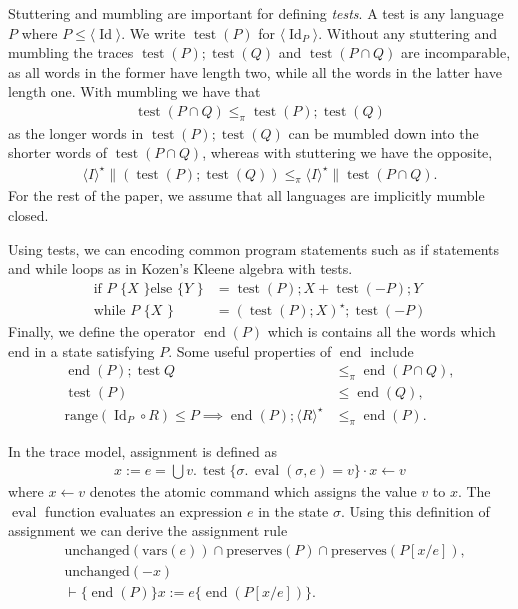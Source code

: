 \documentclass{llncs}
\DeclareMathOperator{\test}{test}
\DeclareMathOperator{\eval}{eval}
\DeclareMathOperator{\Id}{Id}
\DeclareMathOperator{\edn}{end}
\begin{document}
Stuttering and mumbling are important for defining \emph{tests}. A
test is any language $P$ where $P \le \langle \Id\rangle$. We
write $\test(P)$ for $\langle \Id_P\rangle$. Without any
stuttering and mumbling the traces $\test(P); \test(Q)$ and
$\test(P \cap Q)$ are incomparable, as all words in the former have
length two, while all the words in the latter have length one. With mumbling we have that
\begin{align*}
\test(P \cap Q) \le_\pi \test(P); \test(Q)
\end{align*}
as the longer words in $\test(P);\test(Q)$ can be mumbled down into
the shorter words of $\test(P\cap Q)$, whereas with stuttering we
have the opposite,
\begin{align*}
\langle I\rangle^\star \| (\test(P);\test(Q)) \le_\pi \langle I\rangle^\star \| \test(P \cap Q).
\end{align*}
For the rest of the paper, we assume that all languages are
implicitly mumble closed.

Using tests, we can encoding common program statements such as if
statements and while loops as in Kozen's Kleene algebra with tests.
\begin{align*}
\text{if } P \text{ \{ } X \text { \} else \{ } Y \text{ \}} &= \test(P); X + \test(- P); Y\\
\text{while } P \text{ \{ } X \text{ \}} &= (\test(P);X)^\star;\test(- P)
\end{align*}
Finally, we define the operator $\edn(P)$ which is contains all the
words which end in a state satisfying $P$. Some useful properties of $\edn$ include
\begin{align*}
\edn(P); \test{Q} &\le_\pi \edn(P \cap Q),\\
\test(P) &\le \edn(Q),\\
\text{range}(\Id_P \circ R) \le P \implies \edn(P); \langle R\rangle^\star &\le_\pi \edn(P).
\end{align*}

In the trace model, assignment is defined as
\begin{align*}
  x := e = \bigcup v.\,\test\{\sigma.\,\eval(\sigma,e) = v\} \cdot x \leftarrow v
\end{align*}
where $x \leftarrow v$ denotes the atomic command which assigns the
value $v$ to $x$. The $\eval$ function evaluates an expression $e$ in
the state $\sigma$. Using this definition of assignment we can derive
the assignment rule
\begin{align*}
&\text{unchanged}(\text{vars}(e)) \cap \text{preserves}(P) \cap \text{preserves}(P[x/e]),\\
&\text{unchanged}(- {x})\\
&\vdash \{\edn(P)\} x := e \{\edn(P[x/e])\}.
\end{align*}
\end{document}
